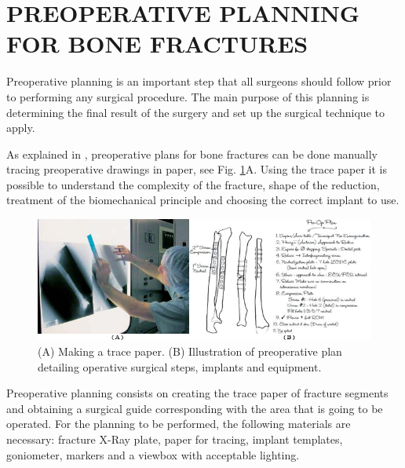 \documentclass{cimenics}
\begin{document}

%
\section{PREOPERATIVE PLANNING FOR BONE FRACTURES}

Preoperative planning is an important step that all surgeons
should follow prior to performing any surgical procedure. The main
purpose of this planning is determining the final result of the
surgery and set up the surgical technique to apply.

As explained in \cite{STAN07}, preoperative plans for bone
fractures can be done manually tracing preoperative drawings in
paper, see Fig. \ref{fig:planificacion}\color{red}A\color{black}.
Using the trace paper it is possible to understand the complexity
of the fracture, shape of the reduction, treatment of the
biomechanical principle and choosing the correct implant to
use.

\begin{figure}[htb]
    \centering
    \includegraphics[width=1.0\columnwidth]{images/planificacion3.png}
    \caption{(A) Making a trace paper. (B) Illustration of preoperative plan detailing operative surgical steps, implants and equipment.}
    \label{fig:planificacion}
\end{figure}

Preoperative planning consists on creating the trace paper of
fracture segments and obtaining a surgical guide corresponding
with the area that is going to be operated. For the planning to be
performed, the following materials are necessary: fracture X-Ray
plate, paper for tracing, implant templates, goniometer, markers
and a viewbox with acceptable lighting.
\end{document}
